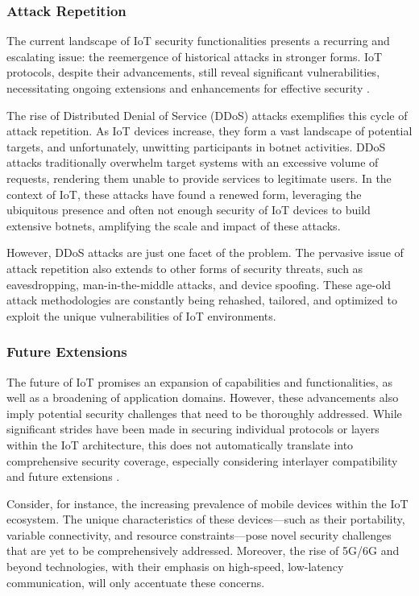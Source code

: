 \documentclass{ieeeaccess}
\begin{document}
\subsubsection{Attack Repetition}

The current landscape of IoT security functionalities presents a recurring and escalating issue: the reemergence of historical attacks in stronger forms. IoT protocols, despite their advancements, still reveal significant vulnerabilities, necessitating ongoing extensions and enhancements for effective security \cite{yang2017survey}.

The rise of Distributed Denial of Service (DDoS) attacks exemplifies this cycle of attack repetition. As IoT devices increase, they form a vast landscape of potential targets, and unfortunately, unwitting participants in botnet activities. DDoS attacks traditionally overwhelm target systems with an excessive volume of requests, rendering them unable to provide services to legitimate users. In the context of IoT, these attacks have found a renewed form, leveraging the ubiquitous presence and often not enough security of IoT devices to build extensive botnets, amplifying the scale and impact of these attacks.

However, DDoS attacks are just one facet of the problem. The pervasive issue of attack repetition also extends to other forms of security threats, such as eavesdropping, man-in-the-middle attacks, and device spoofing. These age-old attack methodologies are constantly being rehashed, tailored, and optimized to exploit the unique vulnerabilities of IoT environments.
	
\subsubsection{Future Extensions}

The future of IoT promises an expansion of capabilities and functionalities, as well as a broadening of application domains. However, these advancements also imply potential security challenges that need to be thoroughly addressed. While significant strides have been made in securing individual protocols or layers within the IoT architecture, this does not automatically translate into comprehensive security coverage, especially considering interlayer compatibility and future extensions \cite{sicari2015security} \cite{Alaba201710}.

Consider, for instance, the increasing prevalence of mobile devices within the IoT ecosystem. The unique characteristics of these devices—such as their portability, variable connectivity, and resource constraints—pose novel security challenges that are yet to be comprehensively addressed. Moreover, the rise of 5G/6G and beyond technologies, with their emphasis on high-speed, low-latency communication, will only accentuate these concerns.
\end{document}
